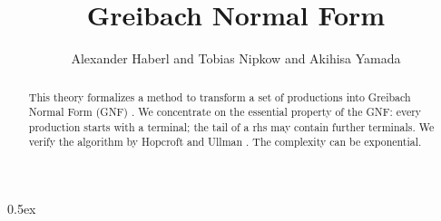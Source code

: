 \documentclass[11pt,a4paper]{article}
\begin{document}
\title{Greibach Normal Form}
\author{Alexander Haberl and Tobias Nipkow and Akihisa Yamada}
\maketitle

\begin{abstract}
This theory formalizes a method to transform a set of productions into 
Greibach Normal Form (GNF) \cite{Greibach}. We concentrate on the essential property of the GNF:
every production starts with a terminal; the tail of a rhs may contain further terminals.
We verify the algorithm by Hopcroft and Ullman \cite{HopcroftU79}.
The complexity can be exponential.
\end{abstract}

\parindent 0pt\parskip 0.5ex





\end{document}
